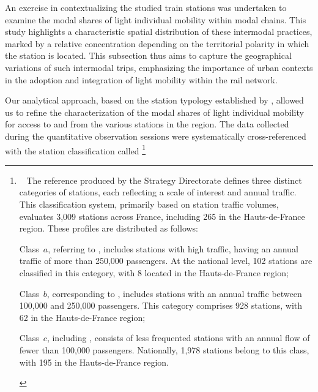 \begin{refsegment}
An exercise in contextualizing the studied train stations was undertaken to examine the modal shares of light individual mobility within modal chains. This study highlights a characteristic spatial distribution of these intermodal practices, marked by a relative concentration depending on the territorial polarity in which the station is located. This subsection thus aims to capture the geographical variations of such intermodal trips, emphasizing the importance of urban contexts in the adoption and integration of light mobility within the rail network.%


Our analytical approach, based on the station typology established by \textcolor{blue}{\textcite{sncf_gares__connexions_gares_2024}}, allowed us to refine the characterization of the modal shares of light individual mobility for access to and from the various stations in the region. The data collected during the quantitative observation sessions were systematically cross-referenced with the station classification called \footnote{~
    The  reference produced by the Strategy Directorate \textcolor{blue}{\textcite{sncf_gares__connexions_gares_2024}} defines three distinct categories of stations, each reflecting a scale of interest and annual traffic. This classification system, primarily based on station traffic volumes, evaluates 3,009 stations across France, including 265 in the Hauts-de-France region. These profiles are distributed as follows: 
    \begin{customitemize}
    \item Class~\(a\), referring to , includes stations with high traffic, having an annual traffic of more than 250,000 passengers. At the national level, 102 stations are classified in this category, with 8 located in the Hauts-de-France region;
    \item Class~\(b\), corresponding to , includes stations with an annual traffic between 100,000 and 250,000 passengers. This category comprises 928 stations, with 62 in the Hauts-de-France region;
    \item Class~\(c\), including , consists of less frequented stations with an annual flow of fewer than 100,000 passengers. Nationally, 1,978 stations belong to this class, with 195 in the Hauts-de-France region.

\end{customitemize}}
\end{refsegment}
